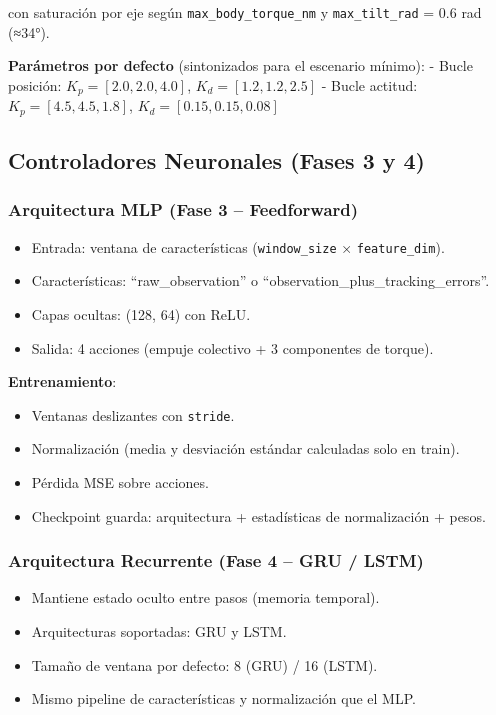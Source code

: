 \documentclass[12pt,a4paper]{article}
\begin{document}
con saturación por eje según \texttt{max\_body\_torque\_nm} y \texttt{max\_tilt\_rad} = 0.6 rad (≈34°).

\textbf{Parámetros por defecto} (sintonizados para el escenario mínimo):
- Bucle posición: $K_p = [2.0, 2.0, 4.0]$, $K_d = [1.2, 1.2, 2.5]$
- Bucle actitud: $K_p = [4.5, 4.5, 1.8]$, $K_d = [0.15, 0.15, 0.08]$

\subsection{Controladores Neuronales (Fases 3 y 4)}

\subsubsection{Arquitectura MLP (Fase 3 -- Feedforward)}

\begin{itemize}
    \item Entrada: ventana de características (\texttt{window\_size} × \texttt{feature\_dim}).
    \item Características: ``raw\_observation'' o ``observation\_plus\_tracking\_errors''.
    \item Capas ocultas: (128, 64) con ReLU.
    \item Salida: 4 acciones (empuje colectivo + 3 componentes de torque).
\end{itemize}

\textbf{Entrenamiento}:
\begin{itemize}
    \item Ventanas deslizantes con \texttt{stride}.
    \item Normalización (media y desviación estándar calculadas solo en train).
    \item Pérdida MSE sobre acciones.
    \item Checkpoint guarda: arquitectura + estadísticas de normalización + pesos.
\end{itemize}

\subsubsection{Arquitectura Recurrente (Fase 4 -- GRU / LSTM)}

\begin{itemize}
    \item Mantiene estado oculto entre pasos (memoria temporal).
    \item Arquitecturas soportadas: GRU y LSTM.
    \item Tamaño de ventana por defecto: 8 (GRU) / 16 (LSTM).
    \item Mismo pipeline de características y normalización que el MLP.
\end{itemize}
\end{document}
